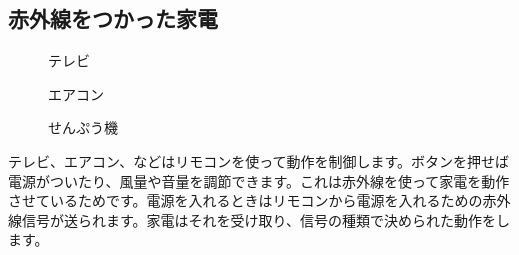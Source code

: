 \subsection{赤外線をつかった家電}

\begin{figure}[H]
  \begin{minipage}[t]{0.3\columnwidth}
    \centering
 
    \caption{テレビ}
  \end{minipage}
  \begin{minipage}[t]{0.3\columnwidth}
    \centering
    
    \caption{エアコン}
  \end{minipage}
  \begin{minipage}[t]{0.3\columnwidth}
    \centering
    
    \caption{せんぷう機}
  \end{minipage}
\end{figure}

テレビ、エアコン、などはリモコンを使って動作を制御します。ボタンを押せば電源がついたり、風量や音量を調節できます。これは赤外線を使って家電を動作させているためです。電源を入れるときはリモコンから電源を入れるための赤外線信号が送られます。家電はそれを受け取り、信号の種類で決められた動作をします。
